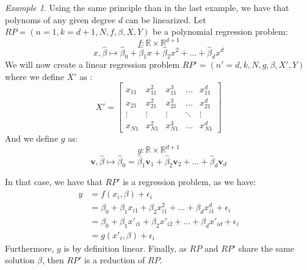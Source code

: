 \documentclass{article}
\theoremstyle{definition}
\theoremstyle{remark}
\theoremstyle{example}
\newtheorem{example}{Example}[section]
\newcommand{\vv}{\mathbf{v}}
\newcommand{\betat}{\hat{\beta}}
\begin{document}
\begin{example}
		Using the same principle than in the last example, we have that polynoms of any given degree $d$ can be linearized. Let $RP = (n=1, k=d+1, N, f, \beta, X, Y)$ be a polynomial regression problem:
            $$f : \mathbb{R} \times \mathbb{R}^{d+1}$$
            $$x, \betat \mapsto \betat_0 + \betat_1 x + \betat_2 x^2 + \dots + \betat_{d} x^d$$
        We will now create a linear regression problem $RP' = (n'=d, k, N, g, \beta, X', Y)$ where we define $X'$ as :
            $$X' = \begin{bmatrix} x_{11} & x_{11}^2 & x_{11}^3 & \dots  & x_{11}^d\\
                                   x_{21} & x_{21}^2 & x_{21}^3 & \dots  & x_{21}^d\\
                                   \vdots & \vdots   & \vdots   & \ddots & \vdots  \\
                                   x_{N1} & x_{N1}^2 & x_{N1}^3 & \dots  & x_{N1}^d \end{bmatrix}$$
        And we define $g$ as:
            $$g : \mathbb{R} \times \mathbb{R}^{d+1}$$
            $$\vv, \betat \mapsto \betat_0 = \betat_1 \vv_1 + \betat_2 \vv_2 + \dots + \betat_d \vv_d$$

        In that case, we have that $RP'$ is a regression problem, as we have:
        \begin{align*}
            y &= f(x_i, \beta) + \epsilon_i\\
              &= \beta_0 + \beta_1 x_{i1} + \beta_2 x_{i1}^2 + \dots + \beta_d x_{i1}^d + \epsilon_i\\
              &= \beta_0 + \beta_1 x'_{i1} + \beta_2 x'_{i2} + \dots + \beta_d x'_{id} + \epsilon_i\\
              &= g(x'_i, \beta) + \epsilon_i
        \end{align*}
        Furthermore, $g$ is by definition linear. Finally, as $RP$ and $RP'$ share the same solution $\beta$, then $RP'$ is a reduction of $RP$.
\end{example}
\end{document}
